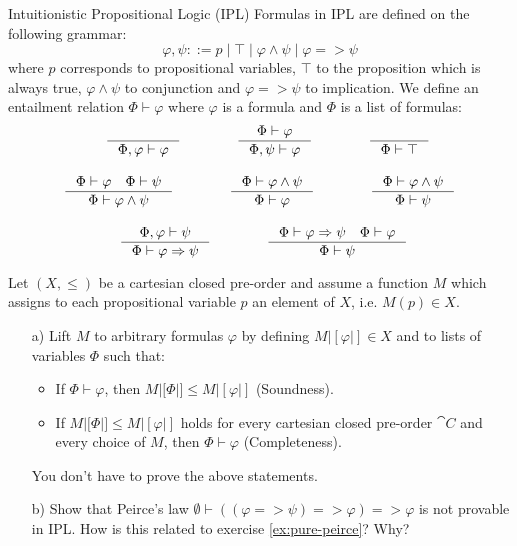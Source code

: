 \begin{definition}{Intuitionistic Propositional Logic (IPL)}
    Formulas in IPL are defined on the following grammar:
    \[\varphi, \psi ::= p \mid \top \mid \varphi \land \psi \mid \varphi => \psi\]
    where $p$ corresponds to propositional variables, $\top$ to the proposition which is always true,
    $\varphi \land \psi$ to conjunction and $\varphi => \psi$ to implication.
    We define an entailment relation $\Phi \vdash \varphi$ where $\varphi$ is a formula and $\Phi$ is a list of formulas:
    \begin{align*}
        & \qquad\quad \inference{}{\Phi, \varphi \vdash \varphi}\qquad\qquad
        \inference{\Phi \vdash \varphi}{\Phi, \psi \vdash \varphi}\qquad\qquad
        \inference{}{\Phi \vdash \top}\\[1em]
        & \inference{\Phi \vdash \varphi \quad \Phi \vdash \psi}{\Phi \vdash \varphi \land \psi}\qquad\qquad
        \inference{\Phi \vdash \varphi \land \psi}{\Phi \vdash \varphi}\qquad\qquad
        \inference{\Phi \vdash \varphi \land \psi}{\Phi \vdash \psi}\\[1em]
        & \qquad\qquad \inference{\Phi, \varphi \vdash \psi}{\Phi \vdash \varphi => \psi}\qquad\qquad
        \inference{\Phi \vdash \varphi => \psi \quad \Phi \vdash \varphi}{\Phi \vdash \psi}
    \end{align*}
\end{definition}

\begin{exercise}
    Let $(X, \le)$ be a cartesian closed pre-order and assume a function $M$ which assigns to each propositional variable $p$ an element of $X$, i.e. $M(p) \in X$.
    \begin{itemize}
        \item[a)] Lift $M$ to arbitrary formulas $\varphi$ by defining $M|[\varphi|] \in X$ and to lists of variables $\Phi$ such that:
            \begin{itemize}
                \item If $\Phi \vdash \varphi$, then $M|[\Phi|] \le M|[\varphi|]$ (Soundness).
                \item If $M|[\Phi|] \le M|[\varphi|]$ holds for every cartesian closed pre-order $\cat{C}$ and every choice of $M$, then $\Phi \vdash \varphi$ (Completeness).
            \end{itemize}
            You don't have to prove the above statements.
        \item[b)] Show that Peirce's law $\emptyset \vdash ((\varphi => \psi) => \varphi) => \varphi$ is not provable in IPL.
            How is this related to exercise \ref{ex:pure-peirce}? Why?
    \end{itemize}
\end{exercise}



